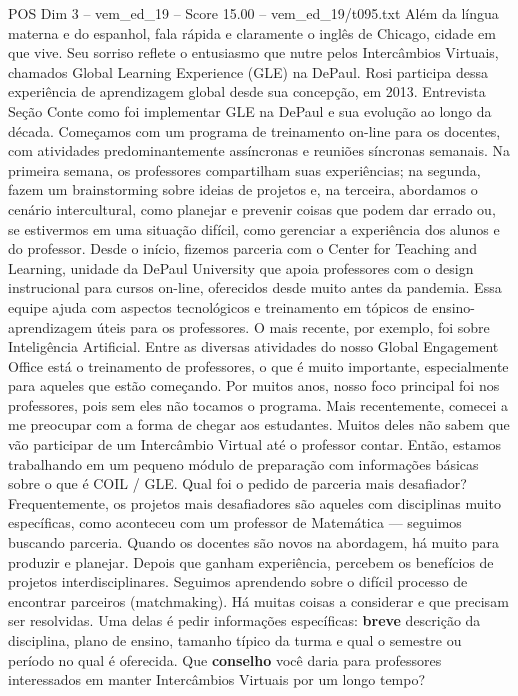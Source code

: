 \begin{textsample}{POS Dim 3 – vem\_ed\_19 – Score 15.00 – vem\_ed\_19/t095.txt}
Além da língua materna e do espanhol, fala rápida e claramente o inglês de Chicago, cidade em que vive.
Seu sorriso reflete o entusiasmo que nutre pelos Intercâmbios Virtuais, chamados Global Learning Experience (GLE) na DePaul.
Rosi participa dessa experiência de aprendizagem global desde sua concepção, em 2013.
Entrevista Seção Conte como foi implementar GLE na DePaul e sua evolução ao longo da década.
Começamos com um programa de treinamento on-line para os docentes, com atividades predominantemente assíncronas e reuniões síncronas semanais.
Na primeira semana, os professores compartilham suas experiências; na segunda, fazem um brainstorming sobre ideias de projetos e, na terceira, abordamos o cenário intercultural, como planejar e prevenir coisas que podem dar errado ou, se estivermos em uma situação difícil, como gerenciar a experiência dos alunos e do professor.
Desde o início, fizemos parceria com o Center for Teaching and Learning, unidade da DePaul University que apoia professores com o design instrucional para cursos on-line, oferecidos desde muito antes da pandemia.
Essa equipe ajuda com aspectos tecnológicos e treinamento em tópicos de ensino-aprendizagem úteis para os professores.
O mais recente, por exemplo, foi sobre Inteligência Artificial.
Entre as diversas atividades do nosso Global Engagement Office está o treinamento de professores, o que é muito importante, especialmente para aqueles que estão começando.
Por muitos anos, nosso foco principal foi nos professores, pois sem eles não tocamos o programa.
Mais recentemente, comecei a me preocupar com a forma de chegar aos estudantes.
Muitos deles não sabem que vão participar de um Intercâmbio Virtual até o professor contar.
Então, estamos trabalhando em um pequeno módulo de preparação com informações básicas sobre o que é COIL / GLE.
Qual foi o pedido de parceria mais desafiador?
Frequentemente, os projetos mais desafiadores são aqueles com disciplinas muito específicas, como aconteceu com um professor de Matemática — seguimos buscando parceria.
Quando os docentes são novos na abordagem, há muito para produzir e planejar.
Depois que ganham experiência, percebem os benefícios de projetos interdisciplinares.
Seguimos aprendendo sobre o difícil processo de encontrar parceiros (matchmaking).
Há muitas coisas a considerar e que precisam ser resolvidas.
Uma delas é pedir informações específicas: \textbf{breve} descrição da disciplina, plano de ensino, tamanho típico da turma e qual o semestre ou período no qual é oferecida.
Que \textbf{conselho} você daria para professores interessados em manter Intercâmbios Virtuais por um longo tempo?

\end{textsample}
